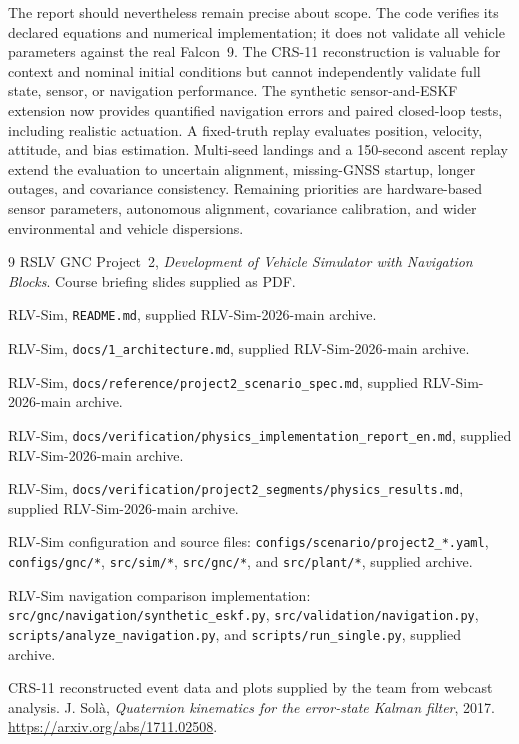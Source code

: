 \documentclass[11pt,letterpaper]{article}
\newcommand{\sourcecode}[1]{\texttt{#1}}
\begin{document}
The report should nevertheless remain precise about scope. The code verifies its declared equations and numerical implementation; it does not validate all vehicle parameters against the real Falcon~9. The CRS-11 reconstruction is valuable for context and nominal initial conditions but cannot independently validate full state, sensor, or navigation performance. The synthetic sensor-and-ESKF extension now provides quantified navigation errors and paired closed-loop tests, including realistic actuation. A fixed-truth replay evaluates position, velocity, attitude, and bias estimation. Multi-seed landings and a 150-second ascent replay extend the evaluation to uncertain alignment, missing-GNSS startup, longer outages, and covariance consistency. Remaining priorities are hardware-based sensor parameters, autonomous alignment, covariance calibration, and wider environmental and vehicle dispersions.


\clearpage
\begin{thebibliography}{9}
RSLV GNC Project~2, \emph{Development of Vehicle Simulator with Navigation Blocks}. Course briefing slides supplied as PDF.

RLV-Sim, \sourcecode{README.md}, supplied RLV-Sim-2026-main archive.

RLV-Sim, \sourcecode{docs/1\_architecture.md}, supplied RLV-Sim-2026-main archive.

RLV-Sim, \sourcecode{docs/reference/project2\_scenario\_spec.md}, supplied RLV-Sim-2026-main archive.

RLV-Sim, \sourcecode{docs/verification/physics\_implementation\_report\_en.md}, supplied RLV-Sim-2026-main archive.

RLV-Sim, \sourcecode{docs/verification/project2\_segments/physics\_results.md}, supplied RLV-Sim-2026-main archive.

RLV-Sim configuration and source files: \sourcecode{configs/scenario/project2\_*.yaml}, \sourcecode{configs/gnc/*}, \sourcecode{src/sim/*}, \sourcecode{src/gnc/*}, and \sourcecode{src/plant/*}, supplied archive.

RLV-Sim navigation comparison implementation: \sourcecode{src/gnc/navigation/synthetic\_eskf.py}, \sourcecode{src/validation/navigation.py}, \sourcecode{scripts/analyze\_navigation.py}, and \sourcecode{scripts/run\_single.py}, supplied archive.

CRS-11 reconstructed event data and plots supplied by the team from webcast analysis.
 J. Sol\`a, \emph{Quaternion kinematics for the error-state Kalman filter}, 2017. \url{https://arxiv.org/abs/1711.02508}.
\end{thebibliography}
\end{document}
